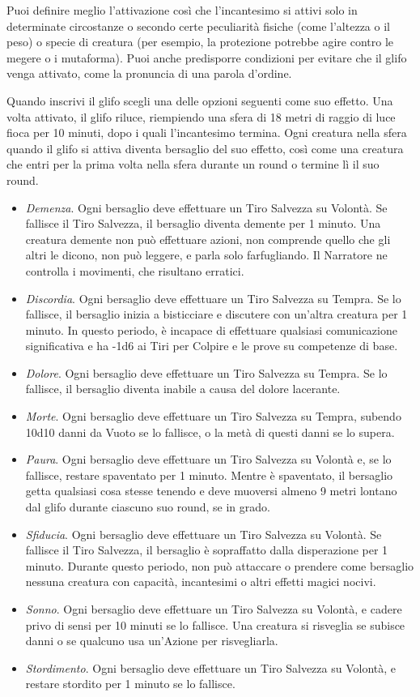\begin{multicols}{2}
Puoi definire meglio l'attivazione così che l'incantesimo si attivi solo in determinate circostanze o secondo certe peculiarità fisiche (come l'altezza o il peso) o specie di creatura (per esempio, la protezione potrebbe agire contro le megere o i mutaforma). Puoi anche predisporre condizioni per evitare che il glifo venga attivato, come la pronuncia di una parola d'ordine.

Quando inscrivi il glifo scegli una delle opzioni seguenti come suo effetto. Una volta attivato, il glifo riluce, riempiendo una sfera di 18 metri di raggio di luce fioca per 10 minuti, dopo i quali l'incantesimo termina. Ogni creatura nella sfera quando il glifo si attiva diventa bersaglio del suo effetto, così come una creatura che entri per la prima volta nella sfera durante un round o termine lì il suo round.

\begin{itemize}[leftmargin=*] \setlength{\itemsep}{0pt}
	\item \emph{Demenza}. Ogni bersaglio deve effettuare un Tiro Salvezza su Volontà. Se fallisce il Tiro Salvezza, il bersaglio diventa demente per 1 minuto. Una creatura demente non può effettuare azioni, non comprende quello che gli altri le dicono, non può leggere, e parla solo farfugliando. Il Narratore ne controlla i movimenti, che risultano erratici.
	\item \emph{Discordia}. Ogni bersaglio deve effettuare un Tiro Salvezza su Tempra. Se lo fallisce, il bersaglio inizia a bisticciare e discutere con un'altra creatura per 1 minuto. In questo periodo, è incapace di effettuare qualsiasi comunicazione significativa e ha -1d6 ai Tiri per Colpire e le prove su competenze di base.
	\item \emph{Dolore}. Ogni bersaglio deve effettuare un Tiro Salvezza su Tempra. Se lo fallisce, il bersaglio diventa inabile a causa del dolore lacerante.
	\item \emph{Morte}. Ogni bersaglio deve effettuare un Tiro Salvezza su Tempra, subendo 10d10 danni da Vuoto se lo fallisce, o la metà di questi danni se lo supera.
	\item \emph{Paura}. Ogni bersaglio deve effettuare un Tiro Salvezza su Volontà e, se lo fallisce, restare spaventato per 1 minuto. Mentre è spaventato, il bersaglio getta qualsiasi cosa stesse tenendo e deve muoversi almeno 9 metri lontano dal glifo durante ciascuno suo round, se in grado.
	\item \emph{Sfiducia}. Ogni bersaglio deve effettuare un Tiro Salvezza su Volontà. Se fallisce il Tiro Salvezza, il bersaglio è sopraffatto dalla disperazione per 1 minuto. Durante questo periodo, non può attaccare o prendere come bersaglio nessuna creatura con capacità, incantesimi o altri effetti magici nocivi.
	\item \emph{Sonno}. Ogni bersaglio deve effettuare un Tiro Salvezza su Volontà, e cadere privo di sensi per 10 minuti se lo fallisce. Una creatura si risveglia se subisce danni o se qualcuno usa un'Azione per risvegliarla.
	\item \emph{Stordimento}. Ogni bersaglio deve effettuare un Tiro Salvezza su Volontà, e restare stordito per 1 minuto se lo fallisce.
\end{itemize}


\end{multicols}

